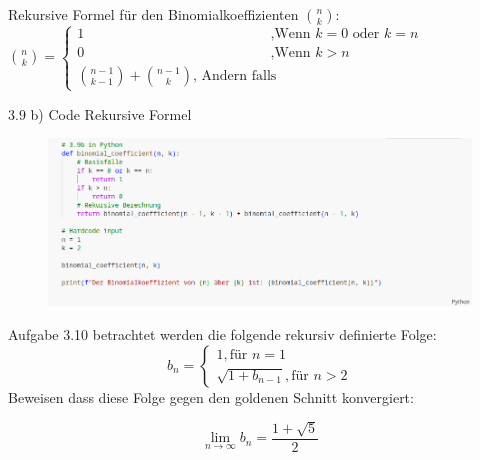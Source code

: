 \documentclass{beamer}
\begin{document}
\begin{frame}
Rekursive Formel für den Binomialkoeffizienten 
$ \binom{n}{k} $:
$\binom{n}{k} = \begin{cases}
    1     \text{ } \text{ } \text{ } \text{ } \text{ }
    \text{ } \text{ } \text{ } \text{ } \text{ } 
    \text{ } \text{ } \text{ } \text{ } \text{ } 
    \text{ } \text{ } \text{ } \text{ } \text{ } 
    \text{,Wenn } k = 0 \text{ oder } k = n \\
    0     \text{ } \text{ } \text{ } \text{ } \text{ }
    \text{ } \text{ } \text{ } \text{ } \text{ } 
    \text{ } \text{ } \text{ } \text{ } \text{ } 
    \text{ } \text{ } \text{ } \text{ } \text{ }  
    \text{,Wenn } k > n \\
    \binom{n-1}{k -1} + \binom{n -1}{k}  
    \text{, Andern falls } 
\end{cases}$        
\end{frame}

\begin{frame}{3.9 b) Code Rekursive Formel }
\begin{figure}
    \begin{center}
        \includegraphics[width=1.3\textwidth]{code/aufg3.9.png}
    \end{center}

\end{figure}


\end{frame}

\begin{frame}{Aufgabe 3.10}
betrachtet werden die folgende rekursiv definierte Folge:
$$b_{n} =
\begin{cases} 
    1, \text{für  } n = 1 \\
    \sqrt{1 + b_{n-1}}, \text{für  } n > 2

\end{cases}$$
Beweisen dass diese Folge gegen den goldenen Schnitt konvergiert:

\[
\lim_{n \to \infty} b_{n}=\frac{1+ \sqrt{5}}{2}
\]
\end{frame}
\end{document}
